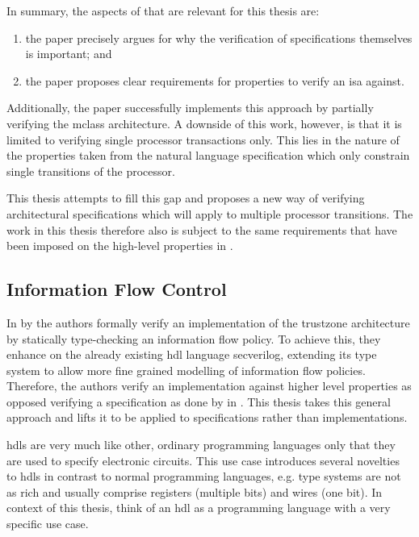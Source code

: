 In summary, the aspects of \cite{Reid17} that are relevant for this thesis are:
\begin{enumerate}[label=\alph*)]
    \item the paper precisely argues for why the verification of specifications themselves is important; and
    \item the paper proposes clear requirements for properties to verify an \gls{isa} against.
\end{enumerate}

Additionally, the paper successfully implements this approach by partially verifying the \gls{mclass} architecture.
A downside of this work, however, is that it is limited to verifying single processor transactions only.
This lies in the nature of the properties taken from the natural language specification which only constrain single transitions of the processor.

This thesis attempts to fill this gap and proposes a new way of verifying architectural specifications which will apply to multiple processor transitions.
The work in this thesis therefore also is subject to the same requirements that have been imposed on the high-level properties in \cite{Reid17}.

\subsection{Information Flow Control}
\label{sec:ifc}

In  \cite{Ferraiuolo17} by \citeauthor{Ferraiuolo17} the authors formally verify an implementation of the \gls{trustzone} architecture by statically type-checking an information flow policy.
To achieve this, they enhance on the already existing \gls{hdl} language \gls{secverilog}, extending its type system to allow more fine grained modelling of information flow policies.
Therefore, the authors verify an implementation against higher level properties as opposed verifying a specification as done by \citeauthor{Reid17} in \cite{Reid17}.
This thesis takes this general approach and lifts it to be applied to specifications rather than implementations.

\glspl{hdl} are very much like other, ordinary programming languages only that they are used to specify electronic circuits.
This use case introduces several novelties to \glspl{hdl} in contrast to normal programming languages, e.g. type systems are not as rich and usually comprise registers (multiple bits) and wires (one bit).
In context of this thesis, think of an \gls{hdl} as a programming language with a very specific use case.

